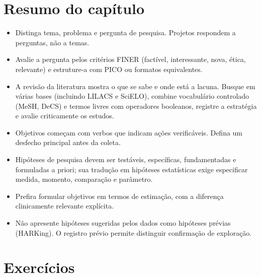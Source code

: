 \documentclass[
]{book}
\providecommand{\tightlist}{%
  \setlength{\itemsep}{0pt}\setlength{\parskip}{0pt}}
\begin{document}
\section{Resumo do capítulo}\label{resumo-do-capuxedtulo-1}

\begin{itemize}
\tightlist
\item
  Distinga tema, problema e pergunta de pesquisa. Projetos respondem a perguntas, não a temas.
\item
  Avalie a pergunta pelos critérios FINER (factível, interessante, nova, ética, relevante) e estruture-a com PICO ou formatos equivalentes.
\item
  A revisão da literatura mostra o que se sabe e onde está a lacuna. Busque em várias bases (incluindo LILACS e SciELO), combine vocabulário controlado (MeSH, DeCS) e termos livres com operadores booleanos, registre a estratégia e avalie criticamente os estudos.
\item
  Objetivos começam com verbos que indicam ações verificáveis. Defina um desfecho principal antes da coleta.
\item
  Hipóteses de pesquisa devem ser testáveis, específicas, fundamentadas e formuladas a priori; sua tradução em hipóteses estatísticas exige especificar medida, momento, comparação e parâmetro.
\item
  Prefira formular objetivos em termos de estimação, com a diferença clinicamente relevante explícita.
\item
  Não apresente hipóteses sugeridas pelos dados como hipóteses prévias (HARKing). O registro prévio permite distinguir confirmação de exploração.
\end{itemize}

\section{Exercícios}\label{exercuxedcios-1}
\end{document}
